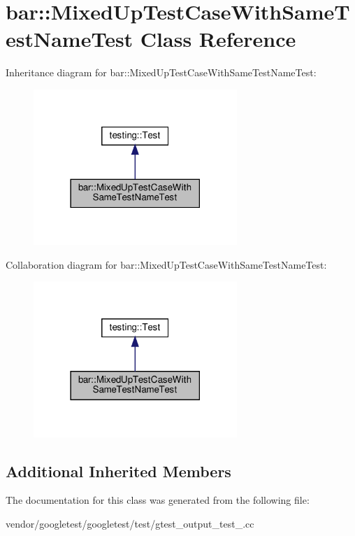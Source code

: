 \hypertarget{classbar_1_1_mixed_up_test_case_with_same_test_name_test}{}\section{bar\+:\+:Mixed\+Up\+Test\+Case\+With\+Same\+Test\+Name\+Test Class Reference}
\label{classbar_1_1_mixed_up_test_case_with_same_test_name_test}


Inheritance diagram for bar\+:\+:Mixed\+Up\+Test\+Case\+With\+Same\+Test\+Name\+Test\+:
\nopagebreak
\begin{figure}[H]
\begin{center}
\leavevmode
\includegraphics[width=218pt]{classbar_1_1_mixed_up_test_case_with_same_test_name_test__inherit__graph}
\end{center}
\end{figure}


Collaboration diagram for bar\+:\+:Mixed\+Up\+Test\+Case\+With\+Same\+Test\+Name\+Test\+:
\nopagebreak
\begin{figure}[H]
\begin{center}
\leavevmode
\includegraphics[width=218pt]{classbar_1_1_mixed_up_test_case_with_same_test_name_test__coll__graph}
\end{center}
\end{figure}
\subsection*{Additional Inherited Members}


The documentation for this class was generated from the following file\+:\begin{DoxyCompactItemize}
\item 
vendor/googletest/googletest/test/gtest\+\_\+output\+\_\+test\+\_\+.\+cc\end{DoxyCompactItemize}
